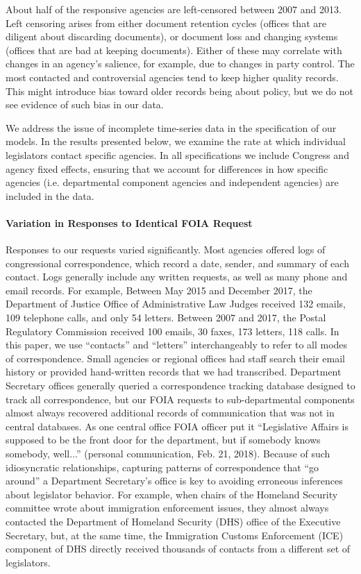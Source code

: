 \documentclass{article}
\begin{document}



About half of the responsive agencies are left-censored between 2007 and 2013. Left censoring arises from either document retention cycles (offices that are diligent about discarding documents), or document loss and changing systems (offices that are bad at keeping documents). Either of these may correlate with changes in an agency's salience, for example, due to changes in party control. 
The most contacted and controversial agencies tend to keep higher quality records. 
This might introduce bias toward older records being about policy, but we do not see evidence of such bias in our data. 

We address the issue of incomplete time-series data in the specification of our models.  In the results presented below, we examine the rate at which individual legislators contact specific agencies. In all specifications we include Congress and agency fixed effects, ensuring that we account for differences in how specific agencies (i.e. departmental component agencies and independent agencies) are included in the data. 

\paragraph{Variation in Responses to Identical FOIA Request} Responses to our requests varied significantly. Most agencies offered logs of congressional correspondence, which record a date, sender, and summary of each contact. Logs generally include any written requests, as well as many phone and email records. For example, Between May 2015 and December 2017, the Department of Justice Office of Administrative Law Judges received 132 emails, 109 telephone calls, and only 54 letters. Between 2007 and 2017, the Postal Regulatory Commission received 100 emails, 30 faxes, 173 letters, 118 calls. In this paper, we use ``contacts'' and ``letters'' interchangeably to refer to all modes of correspondence. 
Small agencies or regional offices had staff search their email history or provided hand-written records that we had transcribed. 
Department Secretary offices generally queried a correspondence tracking database designed to track all correspondence, but our FOIA requests to sub-departmental components almost always recovered additional records of communication that was not in central databases. As one central office FOIA officer put it ``Legislative Affairs is supposed to be the front door for the department, but if somebody knows somebody, well...'' (personal communication, Feb. 21, 2018). Because of such idiosyncratic relationships, capturing patterns of correspondence that ``go around'' a Department Secretary's office is key to avoiding erroneous inferences about legislator behavior. For example, when chairs of the Homeland Security committee wrote about immigration enforcement issues, they almost always contacted the Department of Homeland Security (DHS) office of the Executive Secretary, but, at the same time, the Immigration Customs Enforcement (ICE) component of DHS directly received thousands of contacts from a different set of legislators. 
\end{document}
